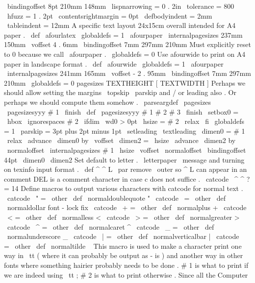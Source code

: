 {{{{{{{}
%
{
\
bindingoffset
}
{
8pt
}
%
{
210mm
}
{
148mm
}
%
%
\
lispnarrowing
=
0
.
2in
\
tolerance
=
800
\
hfuzz
=
1
.
2pt
\
contentsrightmargin
=
0pt
\
defbodyindent
=
2mm
\
tableindent
=
12mm
}
}
%
A
specific
text
layout
24x15cm
overall
intended
for
A4
paper
.
\
def
\
afourlatex
{
{
\
globaldefs
=
1
\
afourpaper
\
internalpagesizes
{
237mm
}
{
150mm
}
%
{
\
voffset
}
{
4
.
6mm
}
%
{
\
bindingoffset
}
{
7mm
}
%
{
297mm
}
{
210mm
}
%
%
%
Must
explicitly
reset
to
0
because
we
call
\
afourpaper
.
\
globaldefs
=
0
}
}
%
Use
afourwide
to
print
on
A4
paper
in
landscape
format
.
\
def
\
afourwide
{
{
\
globaldefs
=
1
\
afourpaper
\
internalpagesizes
{
241mm
}
{
165mm
}
%
{
\
voffset
}
{
-
2
.
95mm
}
%
{
\
bindingoffset
}
{
7mm
}
%
{
297mm
}
{
210mm
}
%
\
globaldefs
=
0
}
}
%
pagesizes
TEXTHEIGHT
[
TEXTWIDTH
]
%
Perhaps
we
should
allow
setting
the
margins
\
topskip
\
parskip
%
and
/
or
leading
also
.
Or
perhaps
we
should
compute
them
somehow
.
%
\
parseargdef
\
pagesizes
{
\
pagesizesyyy
#
1
\
finish
}
\
def
\
pagesizesyyy
#
1
#
2
#
3
\
finish
{
{
%
\
setbox0
=
\
hbox
{
\
ignorespaces
#
2
}
\
ifdim
\
wd0
>
0pt
\
hsize
=
#
2
\
relax
\
fi
\
globaldefs
=
1
%
\
parskip
=
3pt
plus
2pt
minus
1pt
\
setleading
{
\
textleading
}
%
%
\
dimen0
=
#
1
\
relax
\
advance
\
dimen0
by
\
voffset
%
\
dimen2
=
\
hsize
\
advance
\
dimen2
by
\
normaloffset
%
\
internalpagesizes
{
#
1
}
{
\
hsize
}
%
{
\
voffset
}
{
\
normaloffset
}
%
{
\
bindingoffset
}
{
44pt
}
%
{
\
dimen0
}
{
\
dimen2
}
%
}
}
%
Set
default
to
letter
.
%
\
letterpaper
\
message
{
and
turning
on
texinfo
input
format
.
}
\
def
^
^
L
{
\
par
}
%
remove
\
outer
so
^
L
can
appear
in
an
comment
%
DEL
is
a
comment
character
in
case
c
does
not
suffice
.
\
catcode
\
^
^
?
=
14
%
Define
macros
to
output
various
characters
with
catcode
for
normal
text
.
\
catcode
\
"
=
\
other
\
def
\
normaldoublequote
{
"
}
\
catcode
\
=
\
other
\
def
\
normaldollar
{
}
%
font
-
lock
fix
\
catcode
\
+
=
\
other
\
def
\
normalplus
{
+
}
\
catcode
\
<
=
\
other
\
def
\
normalless
{
<
}
\
catcode
\
>
=
\
other
\
def
\
normalgreater
{
>
}
\
catcode
\
^
=
\
other
\
def
\
normalcaret
{
^
}
\
catcode
\
_
=
\
other
\
def
\
normalunderscore
{
_
}
\
catcode
\
|
=
\
other
\
def
\
normalverticalbar
{
|
}
\
catcode
\
~
=
\
other
\
def
\
normaltilde
{
~
}
%
This
macro
is
used
to
make
a
character
print
one
way
in
\
tt
%
(
where
it
can
probably
be
output
as
-
is
)
and
another
way
in
other
fonts
%
where
something
hairier
probably
needs
to
be
done
.
%
%
#
1
is
what
to
print
if
we
are
indeed
using
\
tt
;
#
2
is
what
to
print
%
otherwise
.
Since
all
the
Computer
}}}}
